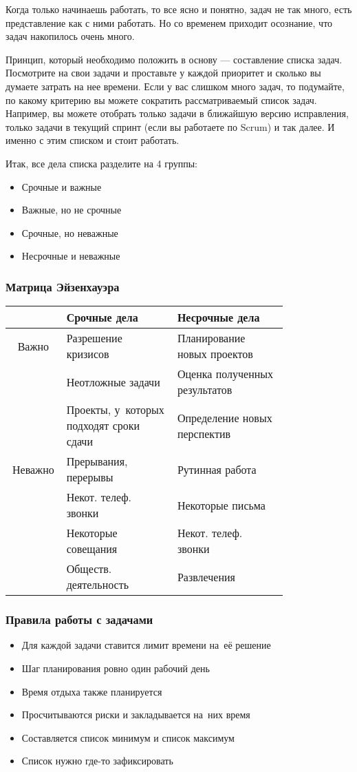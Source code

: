 \documentclass{../industrial-development}
\begin{document}
\lecturenotes

Когда только начинаешь работать, то все ясно и понятно, задач не так много, есть представление как с ними работать. Но со временем приходит осознание, что задач накопилось очень много.

Принцип, который необходимо положить в основу — составление списка задач. Посмотрите на свои задачи и проставьте у каждой приоритет и сколько вы думаете затрать на нее времени. Если у вас слишком много задач, то подумайте, по какому критерию вы можете сократить рассматриваемый список задач. Например, вы можете отобрать только задачи в ближайшую версию исправления, только задачи в текущий спринт (если вы работаете по Scrum) и так далее. И именно с этим списком и стоит работать.

Итак, все дела списка разделите на 4 группы:
\begin{itemize}
\item Срочные и важные
\item Важные, но не срочные
\item Срочные, но неважные
\item Несрочные и неважные~\cite{TMHabr}
\end{itemize}

\begin{frame} \frametitle{Матрица Эйзенхауэра}
  \begin{table}
    \begin{tabular}{|c|p{0.4\linewidth}|p{0.4\linewidth}|}
		\hline
		 & Срочные дела & Несрочные дела \\
		\hline
		Важно & Разрешение кризисов & Планирование новых проектов \\
		 & Неотложные задачи & Оценка полученных результатов \\
		 & Проекты, у~которых подходят сроки сдачи & Определение новых перспектив \\
		\hline
		Неважно & Прерывания, перерывы & Рутинная работа \\
		 & Некот. телеф. звонки & Некоторые письма \\
		 & Некоторые совещания & Некот. телеф. звонки \\
		 & Обществ. деятельность & Развлечения \\
		\hline
    \end{tabular}
  \end{table}
\end{frame}

\begin{frame} \frametitle{Правила работы с задачами}
  \begin{itemize}
  \item Для каждой задачи ставится лимит времени на~её решение
  \item Шаг планирования ровно один рабочий день
  \item Время отдыха также планируется
  \item Просчитываются риски и закладывается на~них время
  \item Составляется список минимум и список максимум
  \item Список нужно где-то зафиксировать
  \end{itemize}
\end{frame}
\end{document}

